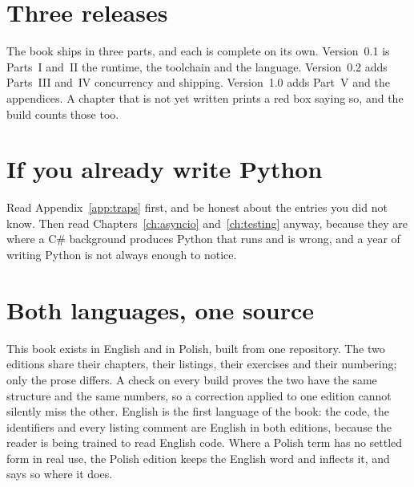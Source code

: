 \section*{Three releases}

The book ships in three parts, and each is complete on its own.
Version~0.1 is Parts~I and~II \dash{} the runtime, the toolchain and the
language. Version~0.2 adds Parts~III and~IV \dash{} concurrency and
shipping. Version~1.0 adds Part~V and the appendices. A chapter that is not
yet written prints a red box saying so, and the build counts those too.

\section*{If you already write Python}

Read Appendix~\ref{app:traps} first, and be honest about the entries you did
not know. Then read Chapters~\ref{ch:asyncio} and~\ref{ch:testing} anyway,
because they are where a C\# background produces Python that runs and is
wrong, and a year of writing Python is not always enough to notice.

\section*{Both languages, one source}

This book exists in English and in Polish, built from one repository. The two
editions share their chapters, their listings, their exercises and their
numbering; only the prose differs. A check on every build proves the two have
the same structure and the same numbers, so a correction applied to one
edition cannot silently miss the other. English is the first language of the
book: the code, the identifiers and every listing comment are English in both
editions, because the reader is being trained to read English code.
Where a Polish term has no settled form in real use, the Polish edition
keeps the English word and inflects it, and says so where it does.
